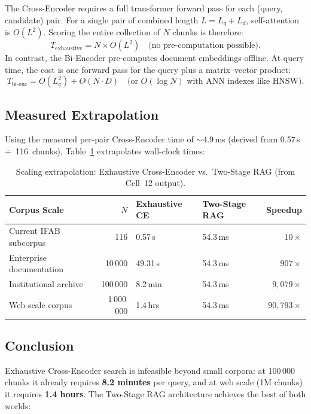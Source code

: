 \documentclass[11pt,a4paper]{article}
\begin{document}
The Cross-Encoder requires a full transformer forward pass for each
(query, candidate) pair.  For a single pair of combined length $L = L_q + L_d$,
self-attention is $O(L^2)$.  Scoring the entire collection of $N$ chunks is
therefore:
\[
    T_{\text{exhaustive}} = N \times O(L^2)
    \quad\text{(no pre-computation possible)}.
\]
In contrast, the Bi-Encoder pre-computes document embeddings offline.
At query time, the cost is one forward pass for the query plus a
matrix--vector product:
\[
    T_{\text{bi-enc}} = O(L_q^2) + O(N \cdot D)
    \quad\text{(or $O(\log N)$ with ANN indexes like HNSW)}.
\]

\subsection{Measured Extrapolation}

Using the measured per-pair Cross-Encoder time of $\sim$4.9\,ms
(derived from 0.57\,s~$\div$~116~chunks), Table~\ref{tab:scaling}
extrapolates wall-clock times:

\begin{table}[H]
\centering
\caption{Scaling extrapolation: Exhaustive Cross-Encoder vs.\ Two-Stage RAG
         (from Cell~12 output).}
\label{tab:scaling}
\begin{tabular}{@{}lrllr@{}}
\toprule
\textbf{Corpus Scale} & \textbf{$N$} & \textbf{Exhaustive CE} & \textbf{Two-Stage RAG} & \textbf{Speedup} \\
\midrule
Current IFAB subcorpus     & 116         & 0.57\,s   & 54.3\,ms & $10\times$ \\
Enterprise documentation   & 10\,000     & 49.31\,s  & 54.3\,ms & $907\times$ \\
Institutional archive      & 100\,000    & 8.2\,min  & 54.3\,ms & $9{,}079\times$ \\
Web-scale corpus           & 1\,000\,000 & 1.4\,hrs  & 54.3\,ms & $90{,}793\times$ \\
\bottomrule
\end{tabular}
\end{table}

\subsection{Conclusion}

Exhaustive Cross-Encoder search is infeasible beyond small corpora: at
100\,000 chunks it already requires \textbf{8.2 minutes} per query, and at
web scale (1M chunks) it requires \textbf{1.4 hours}.  The Two-Stage RAG
architecture achieves the best of both worlds:
\end{document}
